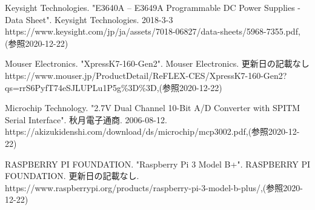 \begin{thebibliography}{9}

Keysight Technologies. "E3640A – E3649A Programmable DC Power Supplies - Data Sheet". Keysight Technologies. 2018-3-3
https://www.keysight.com/jp/ja/assets/7018-06827/data-sheets/5968-7355.pdf,(参照2020-12-22)

Mouser Electronics. "XpressK7-160-Gen2". Mouser Electronics. 更新日の記載なし
https://www.mouser.jp/ProductDetail/ReFLEX-CES/XpressK7-160-Gen2?qs=rrS6PyfT74eSJLUPLu1P5g\%3D\%3D,(参照2020-12-22)

Microchip Technology. "2.7V Dual Channel 10-Bit A/D Converter with SPITM Serial Interface". 秋月電子通商. 2006-08-12.
https://akizukidenshi.com/download/ds/microchip/mcp3002.pdf,(参照2020-12-22)

RASPBERRY PI FOUNDATION. "Raspberry Pi 3 Model B+". RASPBERRY PI FOUNDATION. 更新日の記載なし.
https://www.raspberrypi.org/products/raspberry-pi-3-model-b-plus/,(参照2020-12-22)



\end{thebibliography}
